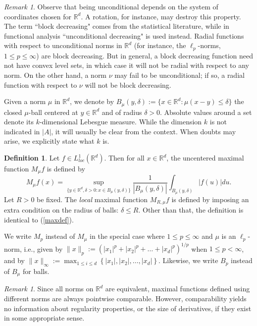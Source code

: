 \documentclass[12pt]{amsart}
\numberwithin{equation}{section}
\theoremstyle{plain}
\theoremstyle{definition}
\newtheorem{definition}[theorem]{Definition}
\theoremstyle{remark}
\newtheorem{remark}[theorem]{Remark}
\begin{document}
\begin{remark} Observe that being unconditional  depends on the system of coordinates
 chosen for $\mathbb{R}^d$. A rotation, for instance, may destroy
this property.
The term ``block decreasing" comes from the statistical literature, while in functional
analysis ``unconditional decreasing" is used instead. Radial functions
  with respect to unconditional norms in $\mathbb{R}^d$ (for instance, the $\ell_p$-norms,
  $1\le p\le\infty$) are block decreasing. But in general, a block decreasing function
  need not have convex level sets, in which case it will not be radial with
  respect to any norm. On the other hand, a norm $\nu$ may fail to be
  unconditional; if so, a radial function with respect to $\nu$
  will
  not  be block decreasing.
\end{remark}

Given a norm $\mu$ in $\mathbb{R}^d$, we denote by $B_\mu(y,\delta) := \{x\in\mathbb{R}^d:
\mu (x - y) \le \delta\}$ the closed $\mu$-ball centered at
$y\in\mathbb{R}^d$ and of radius $\delta>0$. Absolute values around a
set denote its $k$-dimensional Lebesgue measure. While the dimension $k$
is not indicated in $|A|$, it will usually be clear from the context.
When doubts may arise, we explicitly  state what $k$ is.

\begin{definition}
Let  $f\in L^1_{loc}(\mathbb{R}^d)$. Then for all $ x\in\mathbb{R}^d$, the uncentered maximal function
 $M_\mu f$ is defined by
 \begin{equation}\label{maxdef}
    M_\mu f(x)=\sup_{\{y\in \mathbb{R}^d, \delta > 0:  x\in B_\mu(y,\delta)\}}\frac{1}{|B_\mu(y,\delta)|}\int_{B_\mu(y,\delta)}|f(u)|du.
  \end{equation}
Let $R > 0$ be fixed. The {\em local} maximal function $M_{R,\mu}f$ is defined by
imposing an extra condition on the radius of balls: $\delta \le R$. Other than that, the definition is identical to (\ref{maxdef}).
\end{definition}

We write $M_p$ instead of $M_\mu$ in the special case where $1\le p \le \infty$ and $\mu$ is an $\ell_p$-norm, i.e., given by
$\|x\|_p :=\left( |x_1|^p+ |x_2|^p+\dots + |x_d|^p\right)^{1/p}$ when
$1\le p < \infty$, and  by  $\|x\|_\infty :=\max_{1 \le i \le d} \left\{ |x_1|,  |x_2|, \dots , |x_d|\right\}$. Likewise, we write $B_p$ instead of
$B_\mu$ for balls.

\begin{remark} Since all
 norms on $\mathbb{R}^d$ are equivalent, maximal functions defined using
 different norms are always pointwise comparable. However, comparability  yields no information
about  regularity properties, or the size of derivatives, if they
exist in some appropriate sense.
\end{remark}
\end{document}
